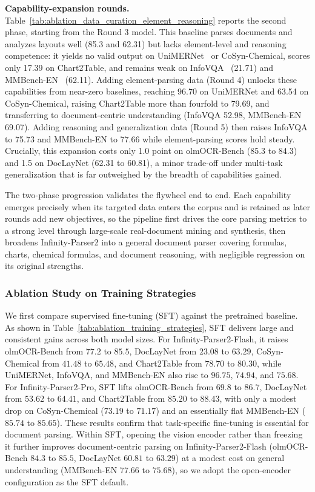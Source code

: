\textbf{Capability-expansion rounds.} Table~\ref{tab:ablation_data_curation_element_reasoning} reports the second phase, starting from the Round 3 model. This baseline parses documents and analyzes layouts well (85.3 and 62.31) but lacks element-level and reasoning competence: it yields no valid output on UniMERNet~\cite{wang2024unimernet} or CoSyn-Chemical, scores only 17.39 on Chart2Table, and remains weak on InfoVQA~\cite{infovqa} (21.71) and MMBench-EN~\cite{liu2024mmbench} (62.11). Adding element-parsing data (Round 4) unlocks these capabilities from near-zero baselines, reaching 96.70 on UniMERNet and 63.54 on CoSyn-Chemical, raising Chart2Table more than fourfold to 79.69, and transferring to document-centric understanding (InfoVQA 52.98, MMBench-EN 69.07). Adding reasoning and generalization data (Round 5) then raises InfoVQA to 75.73 and MMBench-EN to 77.66 while element-parsing scores hold steady. Crucially, this expansion costs only 1.0 point on olmOCR-Bench (85.3 to 84.3) and 1.5 on DocLayNet (62.31 to 60.81), a minor trade-off under multi-task generalization that is far outweighed by the breadth of capabilities gained.

The two-phase progression validates the flywheel end to end. Each capability emerges precisely when its targeted data enters the corpus and is retained as later rounds add new objectives, so the pipeline first drives the core parsing metrics to a strong level through large-scale real-document mining and synthesis, then broadens Infinity-Parser2 into a general document parser covering formulas, charts, chemical formulas, and document reasoning, with negligible regression on its original strengths.

\subsubsection{Ablation Study on Training Strategies}

We first compare supervised fine-tuning (SFT) against the pretrained baseline. As shown in Table~\ref{tab:ablation_training_strategies}, SFT delivers large and consistent gains across both model sizes. For Infinity-Parser2-Flash, it raises olmOCR-Bench from $77.2$ to $85.5$, DocLayNet from $23.08$ to $63.29$, CoSyn-Chemical from $41.48$ to $65.48$, and Chart2Table from $78.70$ to $80.30$, while UniMERNet, InfoVQA, and MMBench-EN also rise to $96.75$, $74.94$, and $75.68$. For Infinity-Parser2-Pro, SFT lifts olmOCR-Bench from $69.8$ to $86.7$, DocLayNet from $53.62$ to $64.41$, and Chart2Table from $85.20$ to $88.43$, with only a modest drop on CoSyn-Chemical ($73.19$ to $71.17$) and an essentially flat MMBench-EN ($85.74$ to $85.65$). These results confirm that task-specific fine-tuning is essential for document parsing. Within SFT, opening the vision encoder rather than freezing it further improves document-centric parsing on Infinity-Parser2-Flash (olmOCR-Bench $84.3$ to $85.5$, DocLayNet $60.81$ to $63.29$) at a modest cost on general understanding (MMBench-EN $77.66$ to $75.68$), so we adopt the open-encoder configuration as the SFT default.


